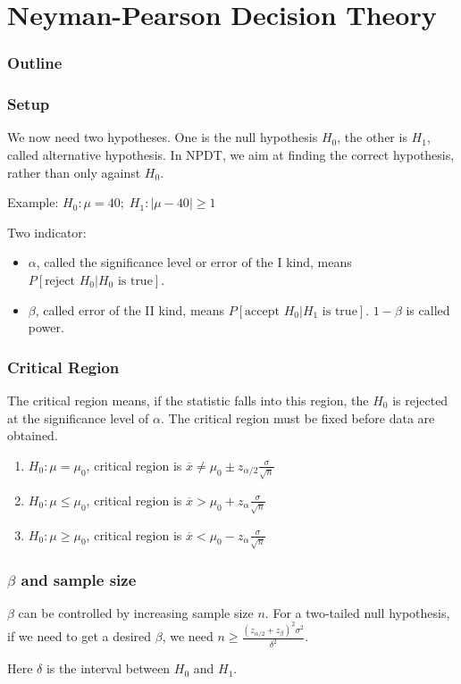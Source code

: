 \documentclass{beamer}
\begin{document}
\section{Neyman-Pearson Decision Theory}
\begin{frame}
    \frametitle{Outline}
    \tableofcontents[currentsection]
\end{frame}
\begin{frame}
    \frametitle{Setup}

    We now need two hypotheses. One is the null hypothesis $H_0$, the other is $H_1$, called alternative
    hypothesis. In NPDT, we aim at finding the correct hypothesis, rather than only against $H_0$.\par
    Example: $H_0: \mu=40;\; H_1: |\mu-40|\geq 1$\par
    Two indicator: 
    \begin{itemize}
        \item $\alpha$, called the significance level or error of the I kind, means $P[\text{reject }H_0|H_0 \text{ is true}]$.
        \item $\beta$, called error of the II kind, means $P[\text{accept }H_0|H_1 \text{ is true}]$. $1-\beta$ is called power.
    \end{itemize}
    

\end{frame}

\begin{frame}
    \frametitle{Critical Region}
    The critical region means, if the statistic falls into this region, the $H_0$ is rejected at the significance level of $\alpha$. The critical region must be fixed before data are obtained.
    \begin{enumerate}
        \item $H_0:\mu=\mu_0$, critical region is $\overline{x}\neq \mu_0\pm z_{\alpha/2}\frac{\sigma}{\sqrt{n}}$
        \item $H_0:\mu\leq\mu_0$, critical region is $\overline{x}> \mu_0+ z_{\alpha}\frac{\sigma}{\sqrt{n}}$
        \item $H_0:\mu\geq\mu_0$, critical region is $\overline{x}< \mu_0- z_{\alpha}\frac{\sigma}{\sqrt{n}}$
    \end{enumerate}
    
\end{frame}

\begin{frame}
    \frametitle{$\beta$ and sample size}
    $\beta$ can be controlled by increasing sample size $n$. For a two-tailed null hypothesis, if we need to get a desired $\beta$, we need $n\geq\frac{(z_{\alpha/2}+{z_{\beta}})^2\sigma^2}{\delta^2}$.\par
    Here $\delta$ is the interval between $H_0$ and $H_1$.
    
    

\end{frame}
\end{document}
